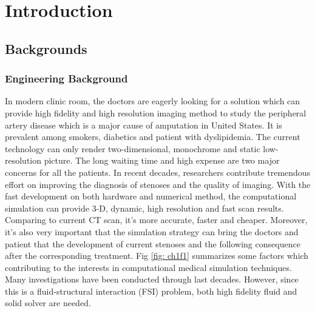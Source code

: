 \chapter{Introduction}
\label{ch:chap1}


\section{Backgrounds}

\subsection{Engineering Background}

In modern clinic room, the doctors are eagerly looking for a solution which can provide high fidelity and high resolution imaging method to study the peripheral artery disease which is a major cause of amputation in United States. It is prevalent among smokers, diabetics and patient with dyslipidemia. The  current technology can only render two-dimensional,  monochrome and static low-resolution picture. The long waiting time and high expense are two major concerns for all the patients. In recent decades, researchers contribute tremendous effort on improving the diagnosis of stenoses and the quality of imaging\cite{clark1976fluid, nesbitt2009shear, wardlaw2006non, stergiopulos1992computer, long2001numerical}. With the fast development on both hardware and numerical method, the computational simulation can provide 3-D, dynamic, high resolution and fast scan results. Comparing to current CT scan, it's more accurate, faster and cheaper. Moreover, it's also very important that the simulation strategy can bring the doctors and patient that the development of current stenoses and the following consequence after the corresponding treatment. Fig \ref{fig: ch1f1} summarizes some factors which contributing to the interests in computational medical simulation techniques\cite{barry2005features}. Many investigations have been conducted through last decades\cite{feng2012viscous, bertram2010evaluation, nadeem2010simulation, ogulu2005simulation}. However, since this is a fluid-structural interaction (FSI) problem, both high fidelity fluid and solid solver are needed. 

